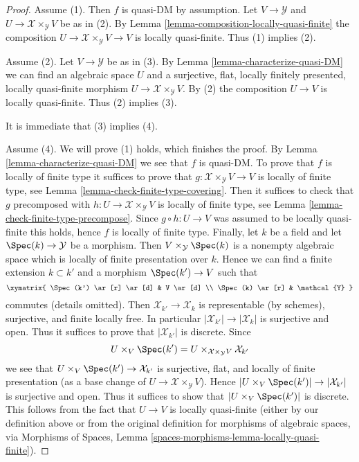 \begin{proof}
Assume (1). Then $f$ is quasi-DM by assumption. Let
$V \to \mathcal{Y}$ and $U \to \mathcal{X} \times_\mathcal{Y} V$
be as in (2). By
Lemma \ref{lemma-composition-locally-quasi-finite}
the composition $U \to \mathcal{X} \times_\mathcal{Y} V \to V$ is
locally quasi-finite. Thus (1) implies (2).

\medskip\noindent
Assume (2). Let $V \to \mathcal{Y}$ be as in (3). By
Lemma \ref{lemma-characterize-quasi-DM}
we can find an algebraic space $U$ and a surjective, flat, locally
finitely presented, locally quasi-finite morphism
$U \to \mathcal{X} \times_\mathcal{Y} V$. By (2) the composition
$U \to V$ is locally quasi-finite. Thus (2) implies (3).

\medskip\noindent
It is immediate that (3) implies (4).

\medskip\noindent
Assume (4). We will prove (1) holds, which finishes the proof. By
Lemma \ref{lemma-characterize-quasi-DM}
we see that $f$ is quasi-DM. To prove that $f$ is locally of finite type
it suffices to prove that $g : \mathcal{X} \times_\mathcal{Y} V \to V$ is
locally of finite type, see
Lemma \ref{lemma-check-finite-type-covering}.
Then it suffices to check that $g$ precomposed with
$h : U \to \mathcal{X} \times_\mathcal{Y} V$ is locally of finite type, see
Lemma \ref{lemma-check-finite-type-precompose}.
Since $g \circ h : U \to V$ was assumed to be locally quasi-finite
this holds, hence $f$ is locally of finite type.
Finally, let $k$ be a field and let $\Spec(k) \to \mathcal{Y}$
be a morphism. Then $V \times_\mathcal{Y} \Spec(k)$ is
a nonempty algebraic space which is locally of finite presentation
over $k$. Hence we can find a finite extension $k \subset k'$ and
a morphism $\Spec(k') \to V$ such that
$$
\xymatrix{
\Spec(k') \ar[r] \ar[d] & V \ar[d] \\
\Spec(k) \ar[r] & \mathcal{Y}
}
$$
commutes (details omitted). Then $\mathcal{X}_{k'} \to \mathcal{X}_k$
is representable (by schemes), surjective, and finite locally free. In
particular $|\mathcal{X}_{k'}| \to |\mathcal{X}_k|$ is surjective and open.
Thus it suffices to prove that $|\mathcal{X}_{k'}|$ is discrete. Since
$$
U \times_V \Spec(k') =
U \times_{\mathcal{X} \times_\mathcal{Y} V} \mathcal{X}_{k'}
$$
we see that $U \times_V \Spec(k') \to \mathcal{X}_{k'}$ is
surjective, flat, and locally of finite presentation (as a base change
of $U \to \mathcal{X} \times_\mathcal{Y} V$). Hence
$|U \times_V \Spec(k')| \to |\mathcal{X}_{k'}|$ is surjective and
open. Thus it suffices to show that $|U \times_V \Spec(k')|$ is
discrete. This follows from the fact that $U \to V$ is locally
quasi-finite (either by our definition above or from the original definition
for morphisms of algebraic spaces, via
Morphisms of Spaces, Lemma \ref{spaces-morphisms-lemma-locally-quasi-finite}).
\end{proof}

